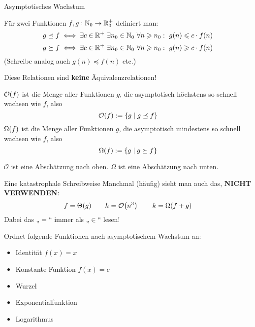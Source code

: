\begin{frame}{Asymptotisches Wachstum}
	\begin{Definition}
		Für zwei Funktionen $f,g: \mathbb{N}_0 \to \mathbb{R}_0^+$ definiert man:
		$$g \preceq f \Gdw \exists c \in \R^+ \ \exists n_0 \in \N_0 \ \forall n \geq n_0: \ g(n) \leq c \* f(n)$$
		$$g \succeq f \Gdw \exists c \in \R^+ \ \exists n_0 \in \N_0 \ \forall n \geq n_0: \ g(n) \geq c \* f(n)$$
		(Schreibe analog auch $g(n) \preceq f(n)$ etc.)
	\end{Definition} \pause
	Diese Relationen sind \textbf{keine} Äquivalenzrelationen!
\end{frame}

\begin{frame}[t]{} %
	\begin{Definition}
		$\mathcal{O}\!\left(f\right)$ ist die Menge aller Funktionen $g$, die asymptotisch höchstens so schnell wachsen wie $f$, also $$\mathcal{O}\!\left(f\right) := \{ g \mid g \preceq f \}$$
		$\Omega\!\left(f\right)$ ist die Menge aller Funktionen $g$, die asymptotisch mindestens so schnell wachsen wie $f$, also $$\Omega\!\left(f\right) := \{ g \mid g \succeq f \}$$
	\end{Definition} \pause
	\impl $\mathcal{O}$ ist eine Abschätzung nach oben. $\Omega$ ist eine Abschätzung nach unten.
\end{frame}




\begin{frame}{Eine katastrophale Schreibweise}
	Manchmal (häufig) sieht man auch das, \textbf{NICHT VERWENDEN}:
	$$f = \Theta(g) \qquad h = \mathcal{O}\!\left(n^3\right) \qquad k = \Omega(f + g)$$
	\pause
	Dabei das „$=$“ immer als „$\in$“ lesen!
\end{frame}

\begin{frame}{}
	Ordnet folgende Funktionen nach asymptotischem Wachstum an:
	\begin{itemize}
		\item Identität $f(x) = x$
		\item Konstante Funktion $f(x) = c$
		\item Wurzel
		\item Exponentialfunktion
		\item Logarithmus
	\end{itemize}
\end{frame}

